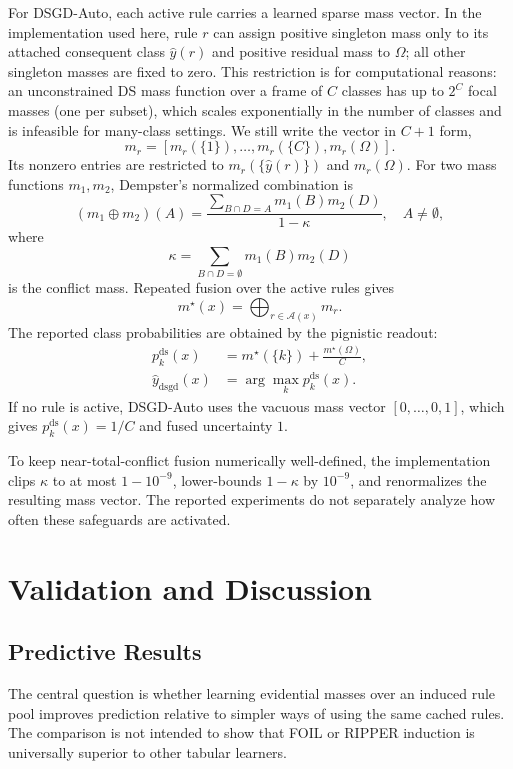 \documentclass[conference]{IEEEtran}
\begin{document}
For DSGD-Auto, each active rule carries a learned sparse mass vector. In the implementation used here, rule $r$ can assign positive singleton mass only to its attached consequent class $\hat{y}(r)$ and positive residual mass to $\Omega$; all other singleton masses are fixed to zero. This restriction is for computational reasons: an unconstrained DS mass function over a frame of $C$ classes has up to $2^C$ focal masses (one per subset), which scales exponentially in the number of classes and is infeasible for many-class settings. We still write the vector in $C{+}1$ form,
\[
  m_r=[m_r(\{1\}),\dots,m_r(\{C\}),m_r(\Omega)].
\]
Its nonzero entries are restricted to $m_r(\{\hat{y}(r)\})$ and $m_r(\Omega)$. For two mass functions $m_1,m_2$, Dempster's normalized combination is
\[
  (m_1\oplus m_2)(A)=
  \frac{\sum_{B\cap D=A}m_1(B)m_2(D)}{1-\kappa},
  \quad A\neq\emptyset,
\]
where
\[
  \kappa=\sum_{B\cap D=\emptyset}m_1(B)m_2(D)
\]
is the conflict mass. Repeated fusion over the active rules gives
\[
  m^\star(x)=\bigoplus_{r\in\mathcal{A}(x)}m_r.
\]
The reported class probabilities are obtained by the pignistic readout:
\begin{align*}
  p^{\mathrm{ds}}_k(x)
    &=m^\star(\{k\})+\frac{m^\star(\Omega)}{C},\\
  \hat{y}_{\mathrm{dsgd}}(x)
    &=\arg\max_k p^{\mathrm{ds}}_k(x).
\end{align*}
If no rule is active, DSGD-Auto uses the vacuous mass vector $[0,\dots,0,1]$, which gives $p^{\mathrm{ds}}_k(x)=1/C$ and fused uncertainty $1$.

To keep near-total-conflict fusion numerically well-defined, the implementation clips $\kappa$ to at most $1-10^{-9}$, lower-bounds $1-\kappa$ by $10^{-9}$, and renormalizes the resulting mass vector. The reported experiments do not separately analyze how often these safeguards are activated.

\section{Validation and Discussion}

\subsection{Predictive Results}

The central question is whether learning evidential masses over an induced rule pool improves prediction relative to simpler ways of using the same cached rules. The comparison is not intended to show that FOIL or RIPPER induction is universally superior to other tabular learners.
\end{document}
